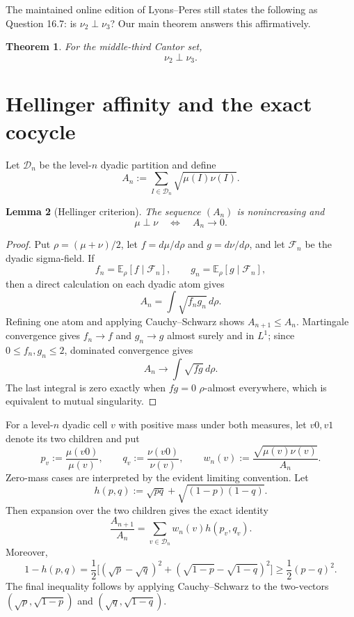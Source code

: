 \documentclass[11pt]{article}
\newtheorem{theorem}{Theorem}[section]
\newtheorem{lemma}[theorem]{Lemma}
\theoremstyle{remark}
\newcommand{\E}{\mathbb E}
\begin{document}
The maintained online edition of Lyons--Peres still states the following as Question 16.7: is $\nu_2\perp\nu_3$?  Our main theorem answers this affirmatively.

\begin{theorem}\label{thm:main}
For the middle-third Cantor set,
\[
   \nu_2\perp\nu_3.
\]
\end{theorem}

\section{Hellinger affinity and the exact cocycle}

Let $\mathcal D_n$ be the level-$n$ dyadic partition and define
\[
 A_n:=\sum_{I\in\mathcal D_n}\sqrt{\mu(I)\nu(I)}.
\]

\begin{lemma}[Hellinger criterion]\label{lem:hellinger}
The sequence $(A_n)$ is nonincreasing and
\[
  \mu\perp\nu \quad\Longleftrightarrow\quad A_n\longrightarrow0.
\]
\end{lemma}

\begin{proof}
Put $\rho=(\mu+\nu)/2$, let $f=d\mu/d\rho$ and $g=d\nu/d\rho$, and let $\mathcal F_n$ be the dyadic sigma-field.  If
\[
  f_n=\E_\rho[f\mid\mathcal F_n],\qquad
  g_n=\E_\rho[g\mid\mathcal F_n],
\]
then a direct calculation on each dyadic atom gives
\[
  A_n=\int\sqrt{f_ng_n}\,d\rho.
\]
Refining one atom and applying Cauchy--Schwarz shows $A_{n+1}\le A_n$.  Martingale convergence gives $f_n\to f$ and $g_n\to g$ almost surely and in $L^1$; since $0\le f_n,g_n\le2$, dominated convergence gives
\[
  A_n\longrightarrow\int\sqrt{fg}\,d\rho.
\]
The last integral is zero exactly when $fg=0$ $\rho$-almost everywhere, which is equivalent to mutual singularity.
\end{proof}

For a level-$n$ dyadic cell $v$ with positive mass under both measures, let $v0,v1$ denote its two children and put
\[
 p_v:=\frac{\mu(v0)}{\mu(v)},\qquad
 q_v:=\frac{\nu(v0)}{\nu(v)},\qquad
 w_n(v):=\frac{\sqrt{\mu(v)\nu(v)}}{A_n}.
\]
Zero-mass cases are interpreted by the evident limiting convention.  Let
\[
 h(p,q):=\sqrt{pq}+\sqrt{(1-p)(1-q)}.
\]
Then expansion over the two children gives the exact identity
\begin{equation}\label{eq:cocycle}
 \frac{A_{n+1}}{A_n}=\sum_{v\in\mathcal D_n}w_n(v)h(p_v,q_v).
\end{equation}
Moreover,
\begin{equation}\label{eq:hell-loss}
 1-h(p,q)
 =\frac12\Big[(\sqrt p-\sqrt q)^2+(\sqrt{1-p}-\sqrt{1-q})^2\Big]
 \ge \frac12(p-q)^2.
\end{equation}
The final inequality follows by applying Cauchy--Schwarz to the two-vectors $(\sqrt p,\sqrt{1-p})$ and $(\sqrt q,\sqrt{1-q})$.
\end{document}
